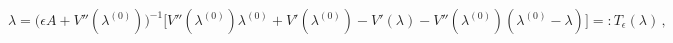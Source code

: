 \begin{equation}
\lambda = \bigl(\epsilon A +V''(\lambda^{(0)})\bigr)^{-1}
\bigl[V''(\lambda^{(0)})\lambda^{(0)} + V'(\lambda^{(0)})-
V'(\lambda) - V''(\lambda^{(0)})(\lambda^{(0)}-\lambda)
\bigr] =:T_\epsilon(\lambda) \,,
\end{equation}

